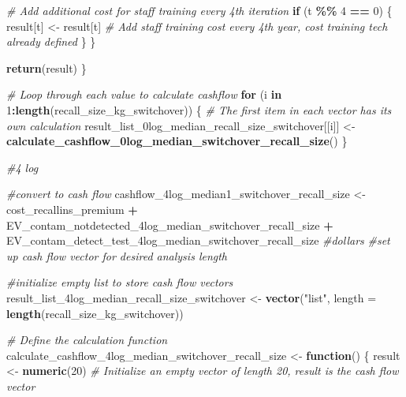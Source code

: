 \documentclass[
]{article}
\newenvironment{Shaded}{\begin{snugshade}}{\end{snugshade}}
\newcommand{\AttributeTok}[1]{\textcolor[rgb]{0.13,0.29,0.53}{#1}}
\newcommand{\CommentTok}[1]{\textcolor[rgb]{0.56,0.35,0.01}{\textit{#1}}}
\newcommand{\ControlFlowTok}[1]{\textcolor[rgb]{0.13,0.29,0.53}{\textbf{#1}}}
\newcommand{\DecValTok}[1]{\textcolor[rgb]{0.00,0.00,0.81}{#1}}
\newcommand{\FunctionTok}[1]{\textcolor[rgb]{0.13,0.29,0.53}{\textbf{#1}}}
\newcommand{\NormalTok}[1]{#1}
\newcommand{\OtherTok}[1]{\textcolor[rgb]{0.56,0.35,0.01}{#1}}
\newcommand{\SpecialCharTok}[1]{\textcolor[rgb]{0.81,0.36,0.00}{\textbf{#1}}}
\newcommand{\StringTok}[1]{\textcolor[rgb]{0.31,0.60,0.02}{#1}}
\begin{document}
\begin{Shaded}
\begin{Highlighting}[]
    \CommentTok{\# Add additional cost for staff training every 4th iteration}
    \ControlFlowTok{if}\NormalTok{ (t }\SpecialCharTok{\%\%} \DecValTok{4} \SpecialCharTok{==} \DecValTok{0}\NormalTok{) \{}
\NormalTok{      result[t] }\OtherTok{\textless{}{-}}\NormalTok{ result[t]  }\CommentTok{\# Add staff training cost every 4th year, cost training tech already defined}
\NormalTok{    \}}
\NormalTok{  \}}
  
  \FunctionTok{return}\NormalTok{(result)}
\NormalTok{\}}

\CommentTok{\# Loop through each value to calculate cashflow}
\ControlFlowTok{for}\NormalTok{ (i }\ControlFlowTok{in} \DecValTok{1}\SpecialCharTok{:}\FunctionTok{length}\NormalTok{(recall\_size\_kg\_switchover)) \{}
  \CommentTok{\# The first item in each vector has its own calculation}
\NormalTok{  result\_list\_0log\_median\_recall\_size\_switchover[[i]] }\OtherTok{\textless{}{-}} \FunctionTok{calculate\_cashflow\_0log\_median\_switchover\_recall\_size}\NormalTok{()}
\NormalTok{\}}



\CommentTok{\#4 log}

\CommentTok{\#convert to cash flow}
\NormalTok{cashflow\_4log\_median1\_switchover\_recall\_size }\OtherTok{\textless{}{-}}\NormalTok{ cost\_recallins\_premium }\SpecialCharTok{+}\NormalTok{ EV\_contam\_notdetected\_4log\_median\_switchover\_recall\_size }\SpecialCharTok{+}\NormalTok{ EV\_contam\_detect\_test\_4log\_median\_switchover\_recall\_size }\CommentTok{\#dollars}
\CommentTok{\#set up cash flow vector for desired analysis length}


\CommentTok{\#initialize empty list to store cash flow vectors}
\NormalTok{result\_list\_4log\_median\_recall\_size\_switchover }\OtherTok{\textless{}{-}} \FunctionTok{vector}\NormalTok{(}\StringTok{"list"}\NormalTok{, }\AttributeTok{length =} \FunctionTok{length}\NormalTok{(recall\_size\_kg\_switchover))}


\CommentTok{\# Define the calculation function}
\NormalTok{calculate\_cashflow\_4log\_median\_switchover\_recall\_size }\OtherTok{\textless{}{-}} \ControlFlowTok{function}\NormalTok{() \{}
\NormalTok{  result }\OtherTok{\textless{}{-}} \FunctionTok{numeric}\NormalTok{(}\DecValTok{20}\NormalTok{)  }\CommentTok{\# Initialize an empty vector of length 20, result is the cash flow vector}
  

\end{Highlighting}
\end{Shaded}
\end{document}
